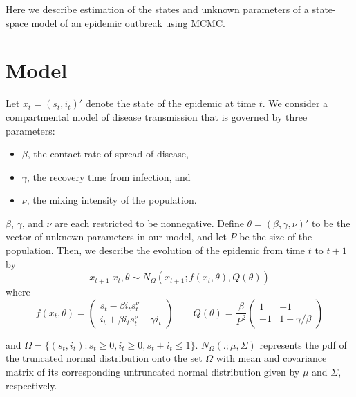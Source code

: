 \documentclass{article}
\begin{document}
Here we describe estimation of the states and unknown parameters of a state-space model of an epidemic outbreak using MCMC.

\section{Model \label{sec:model}}

Let $x_t = (s_t,i_t)'$ denote the state of the epidemic at time $t$. We consider a compartmental model of disease transmission that is governed by three parameters:

\begin{itemize}
\item $\beta$, the contact rate of spread of disease,
\item $\gamma$, the recovery time from infection, and
\item $\nu$, the mixing intensity of the population.
\end{itemize}

\noindent $\beta$, $\gamma$, and $\nu$ are each restricted to be nonnegative. Define $\theta = (\beta,\gamma,\nu)'$ to be the vector of unknown parameters in our model, and let $P$ be the size of the population. Then, we describe the evolution of the epidemic from time $t$ to $t + 1$ by
\begin{equation}
x_{t+1}\left|x_t,\theta\right. \sim N_\Omega\left(x_{t+1};f(x_t,\theta),Q(\theta)\right) \label{eqn:state}
\end{equation}
\noindent where
\[
f(x_t,\theta) = \left(
\begin{array}{c}
s_t - \beta i_ts^{\nu}_t \phantom{- \gamma i_t}\,\, \\
i_t +  \beta i_ts^\nu_t - \gamma i_t
\end{array}
\right)
\qquad
Q(\theta) = \frac{\beta}{P^2} \left(
\begin{array}{ccccc}
1 & -1 \\
-1 & 1 + \gamma/\beta
\end{array}
\right)
\]

\noindent and $\Omega = \{(s_t,i_t): s_t \ge 0, i_t \ge 0, s_t + i_t \le 1\}$. $N_{\Omega}(.; \mu,\Sigma)$ represents the pdf of the truncated normal distribution onto the set $\Omega$ with mean and covariance matrix of its corresponding untruncated normal distribution given by $\mu$ and $\Sigma$, respectively.
\end{document}

